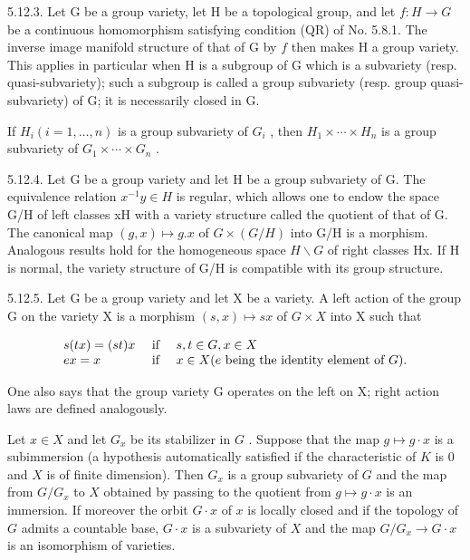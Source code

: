 5.12.3. Let G be a group variety, let H be a topological group, and let \(f:H\to G\) be a continuous homomorphism satisfying condition (QR) of No. 5.8.1. The inverse image manifold structure of that of G by \(f\) then makes H a group variety. This applies in particular when H is a subgroup of G which is a subvariety (resp. quasi-subvariety); such a subgroup is called a group subvariety (resp. group quasi-subvariety) of G; it is necessarily closed in G.

If \(H_{i}(i=1,\ldots,n)\) is a group subvariety of \(G_{i}\) , then \(H_{1}\times\cdots\times H_{n}\) is a group subvariety of \(G_{1}\times\cdots\times G_{n}\) .

5.12.4. Let G be a group variety and let H be a group subvariety of G. The equivalence relation \(x^{-1}y \in H\) is regular, which allows one to endow the space G/H of left classes xH with a variety structure called the quotient of that of G. The canonical map \((g, x) \mapsto g.x\) of \(G \times (G/H)\) into G/H is a morphism. Analogous results hold for the homogeneous space \(H\backslash G\) of right classes Hx. If H is normal, the variety structure of G/H is compatible with its group structure.

5.12.5. Let G be a group variety and let X be a variety. A left action of the group G on the variety X is a morphism \((s, x) \mapsto sx\) of \(G \times X\) into X such that

\[
\begin{array}{l l} s (t x) = (s t) x & \text { if } \quad s, t \in G, x \in X \\ e x = x & \text { if } \quad x \in X (e \text { being   the   identity   element   of } G). \end{array}
\]

One also says that the group variety G operates on the left on X; right action laws are defined analogously.

Let \(x \in X\) and let \(G_x\) be its stabilizer in \(G\) . Suppose that the map \(g \mapsto g \cdot x\) is a subimmersion (a hypothesis automatically satisfied if the characteristic of \(K\) is 0 and \(X\) is of finite dimension). Then \(G_x\) is a group subvariety of \(G\) and the map from \(G/G_x\) to \(X\) obtained by passing to the quotient from \(g \mapsto g \cdot x\) is an immersion. If moreover the orbit \(G \cdot x\) of \(x\) is locally closed and if the topology of \(G\) admits a countable base, \(G \cdot x\) is a subvariety of \(X\) and the map \(G/G_x \to G \cdot x\) is an isomorphism of varieties.

